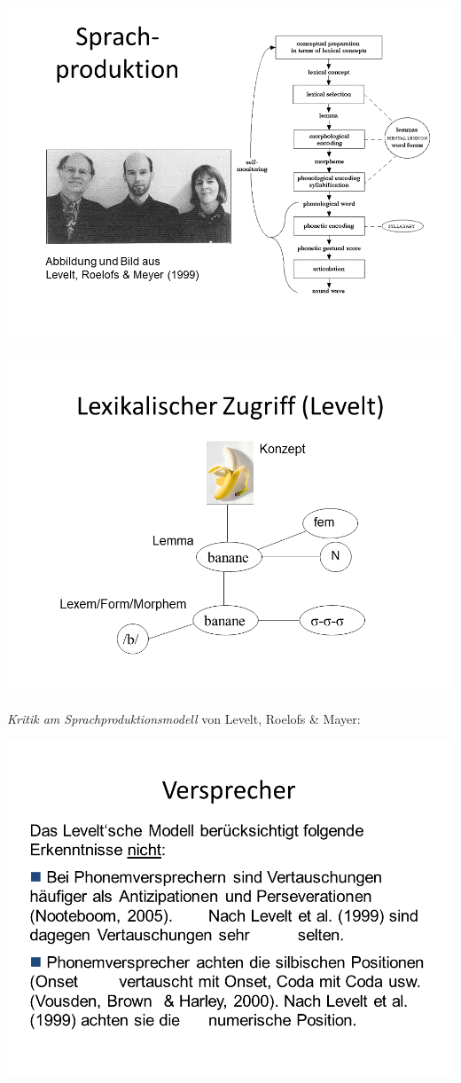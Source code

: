 \documentclass[
  letterpaper,
]{scrbook}
\begin{document}
\includegraphics[width=1\textwidth,height=\textheight]{./pictures/Versprechertypen_12.PNG}

\includegraphics[width=1\textwidth,height=\textheight]{./pictures/Versprechertypen_13.PNG}

\emph{Kritik am Sprachproduktionsmodell} von Levelt, Roelofs \& Mayer:

\includegraphics[width=1\textwidth,height=\textheight]{./pictures/Versprechertypen_14.PNG}
\end{document}
